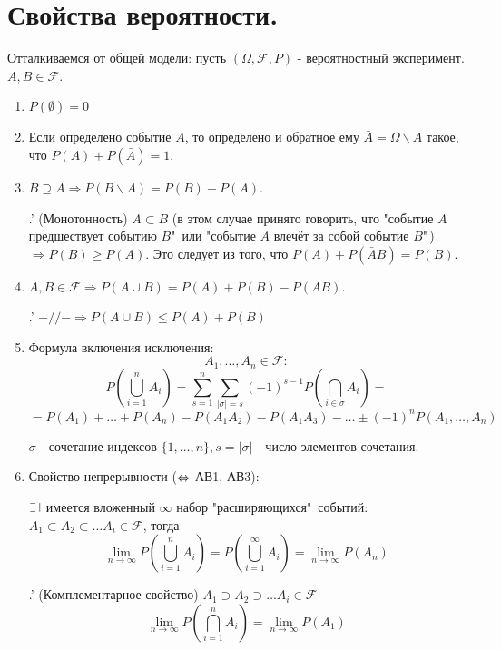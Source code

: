 


	
\renewcommand{\figurename}{Рисунок}

\tableofcontents

\newpage

\section{Свойства вероятности.}

Отталкиваемся от общей модели: пусть $(\Omega, \mathcal{F}, P)$ - вероятностный эксперимент. $A, B \in \mathcal{F}$.

\begin{enumerate}
	\item $P(\emptyset) = 0$
	\item Если определено событие $A$, то определено и обратное ему $\bar A = \Omega \backslash A$ такое, что $P(A) + P( \bar A) = 1$.
	\item $B \supseteq A \Rightarrow P(B \backslash A) = P(B) - P(A)$. 
	
	.' (Монотонность) $A \subset B$ (в этом случае принято говорить, что "событие $A$ предшествует событию $B$"\, или "событие $A$ влечёт за собой событие $B$"\,) $\Rightarrow P(B) \ge P(A)$. Это следует из того, что $P(A) + P(\bar A B) = P(B)$.
	
	\item $A, B \in \mathcal{F} \Rightarrow P(A \cup B) = P(A) + P(B) - P(AB) $. 
	
	.' $-//- \Rightarrow P(A \cup B) \le P(A) + P(B)$
	
	\item Формула включения исключения: 
	\[A_1, \dots, A_n \in \mathcal{F}: \]
	\[P \left(\bigcup_{i=1}^{n} A_i \right) = \sum_{s=1}^{n} \sum_{|\sigma| = s} (-1)^{s-1} P \left(\bigcap_{i \in \sigma} A_i \right) = \] 
	\[= P(A_1) + \dots + P(A_n) - P(A_1 A_2) - P(A_1 A_3) - \dots \pm (-1)^n P(A_1, \dots, A_n) \]
	
	\noindent $\sigma$ - сочетание индексов $\{ 1, \dots, n \}, s = |\sigma|$ - число элементов сочетания.
	\item Свойство непрерывности ($\operatorname{\Leftrightarrow}$ АВ1, АВ3):
	
	$\letus$ имеется вложенный $\infty$ набор "расширяющихся"\, событий: $ A_1 \subset A_2 \subset \dots A_i \in \mathcal{F} $, тогда
	\[ \lim_{n \to \infty} P \left( \bigcup_{i=1}^{n} A_i \right) = P \left( \bigcup_{i=1}^{\infty} A_i \right) = \lim_{n \to \infty} P(A_n) \]
	
	.' (Комплементарное свойство) $A_1 \supset A_2 \supset \dots A_i \in \mathcal{F}$
	\[ \lim_{n \to \infty} P \left( \bigcap_{i=1}^{n} A_i \right) = \lim_{n \to \infty} P(A_1) \]
\end{enumerate}

